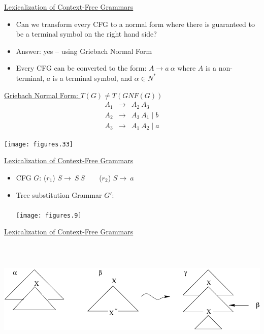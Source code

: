 \documentclass[landscape]{slides}
\begin{document}
\begin{slide}{\underline{Lexicalization of Context-Free Grammars}}
\begin{itemize}
\item Can we transform every CFG to a normal form where there is
  guaranteed to be a terminal symbol on the right hand side?
\item Answer: {\color{blue} yes} -- using Griebach Normal Form
\item Every CFG can be converted to the form: $A \rightarrow a\
  \alpha$ where $A$ is a non-terminal, $a$ is a terminal symbol, and
  $\alpha \in N^\ast$
\end{itemize}
\end{slide}

\begin{slide}{\underline{Griebach Normal Form: $T(G) \neq T(GNF(G))$}}
\begin{eqnarray}
A_1 & \rightarrow & A_2\ A_3 \nonumber \\
A_2 & \rightarrow & A_3\ A_1 \mid b \nonumber \\
A_3 & \rightarrow & A_1\ A_2 \mid a\nonumber 
\end{eqnarray}
\begin{center}
\texttt{[image: figures.33]}
\end{center}
\end{slide}

\begin{slide}{\underline{Lexicalization of Context-Free Grammars}}
\begin{itemize}
\item CFG $G$: ($r_1$) $S \rightarrow\ S\ S$\ \ \ \ ($r_2$) $S \rightarrow\ a$
\item Tree substitution Grammar $G'$:\\\ 
\\
\texttt{[image: figures.9]}
\end{itemize}
\end{slide}

\begin{slide}{\underline{Lexicalization of Context-Free Grammars}}
\begin{center}
\includegraphics[height=2.25in]{adjunction}
\end{center}
\end{slide}
\end{document}
